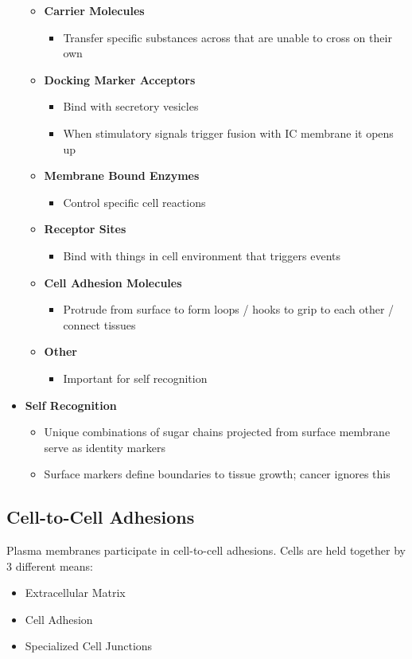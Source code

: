 \documentclass[11pt]{article}
\begin{document}
\begin{itemize}
\begin{itemize}
\item \textbf{Carrier Molecules}
\begin{itemize}
\item Transfer specific substances across that are unable to cross on their own
\end{itemize}
\item \textbf{Docking Marker Acceptors}
\begin{itemize}
\item Bind with secretory vesicles
\item When stimulatory signals trigger fusion with IC membrane it opens up
\end{itemize}
\item \textbf{Membrane Bound Enzymes}
\begin{itemize}
\item Control specific cell reactions
\end{itemize}
\item \textbf{Receptor Sites}
\begin{itemize}
\item Bind with things in cell environment that triggers events
\end{itemize}
\item \textbf{Cell Adhesion Molecules}
\begin{itemize}
\item Protrude from surface to form loops / hooks to grip to each other / connect tissues
\end{itemize}
\item \textbf{Other}
\begin{itemize}
\item Important for self recognition
\end{itemize}
\end{itemize}
\item \textbf{Self Recognition}
\begin{itemize}
\item Unique combinations of sugar chains projected from surface membrane serve as identity markers
\item Surface markers define boundaries to tissue growth; cancer ignores this
\end{itemize}
\end{itemize}


\subsection{Cell-to-Cell Adhesions}
Plasma membranes participate in cell-to-cell adhesions. Cells are held together by 3 different means:
\begin{itemize}
\item Extracellular Matrix
\item Cell Adhesion
\item Specialized Cell Junctions
\end{itemize}
\end{document}
